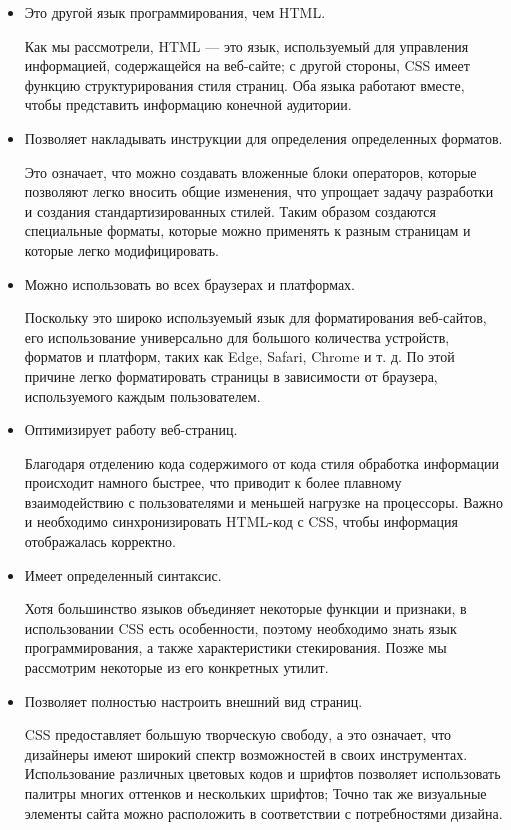 \begin{itemize}
\item Это другой язык программирования, чем HTML.

Как мы рассмотрели, HTML — это язык, используемый для управления информацией, содержащейся на веб-сайте; с другой стороны, CSS имеет функцию структурирования стиля страниц. Оба языка работают вместе, чтобы представить информацию конечной аудитории.

\item Позволяет накладывать инструкции для определения определенных форматов.

Это означает, что можно создавать вложенные блоки операторов, которые позволяют легко вносить общие изменения, что упрощает задачу разработки и создания стандартизированных стилей. Таким образом создаются специальные форматы, которые можно применять к разным страницам и которые легко модифицировать.

\item Можно использовать во всех браузерах и платформах.

Поскольку это широко используемый язык для форматирования веб-сайтов, его использование универсально для большого количества устройств, форматов и платформ, таких как Edge, Safari, Chrome и т. д. По этой причине легко форматировать страницы в зависимости от браузера, используемого каждым пользователем.

\item Оптимизирует работу веб-страниц.

Благодаря отделению кода содержимого от кода стиля обработка информации происходит намного быстрее, что приводит к более плавному взаимодействию с пользователями и меньшей нагрузке на процессоры. Важно и необходимо синхронизировать HTML-код с CSS, чтобы информация отображалась корректно.

\item Имеет определенный синтаксис.


Хотя большинство языков объединяет некоторые функции и признаки, в использовании CSS есть особенности, поэтому необходимо знать язык программирования, а также характеристики стекирования. Позже мы рассмотрим некоторые из его конкретных утилит.

\item Позволяет полностью настроить внешний вид страниц.

CSS предоставляет большую творческую свободу, а это означает, что дизайнеры имеют широкий спектр возможностей в своих инструментах. Использование различных цветовых кодов и шрифтов позволяет использовать палитры многих оттенков и нескольких шрифтов; Точно так же визуальные элементы сайта можно расположить в соответствии с потребностями дизайна.
\end{itemize}

